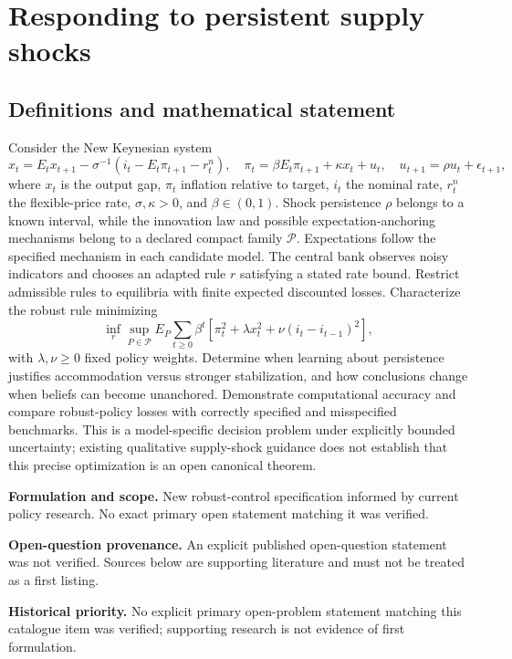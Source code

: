 \documentclass[11pt]{article}
\begin{document}
\section*{Responding to persistent supply shocks}\label{30007529}
\subsection{Definitions and mathematical statement}
Consider the New Keynesian system
\[
x_t=E_tx_{t+1}-\sigma^{-1}(i_t-E_t\pi_{t+1}-r_t^n),\quad
\pi_t=\beta E_t\pi_{t+1}+\kappa x_t+u_t,\quad
u_{t+1}=\rho u_t+\epsilon_{t+1},
\]
where \(x_t\) is the output gap, \(\pi_t\) inflation relative to target, \(i_t\) the nominal rate, \(r_t^n\) the flexible-price rate, \(\sigma,\kappa>0\), and \(\beta\in(0,1)\). Shock persistence \(\rho\) belongs to a known interval, while the innovation law and possible expectation-anchoring mechanisms belong to a declared compact family \(\mathcal P\). Expectations follow the specified mechanism in each candidate model. The central bank observes noisy indicators and chooses an adapted rule \(r\) satisfying a stated rate bound. Restrict admissible rules to equilibria with finite expected discounted losses.
Characterize the robust rule minimizing
\[
\inf_r\sup_{P\in\mathcal P}E_P\sum_{t\ge0}\beta^t
[\pi_t^2+\lambda x_t^2+\nu(i_t-i_{t-1})^2],
\]
with \(\lambda,\nu\ge0\) fixed policy weights. Determine when learning about persistence justifies accommodation versus stronger stabilization, and how conclusions change when beliefs can become unanchored. Demonstrate computational accuracy and compare robust-policy losses with correctly specified and misspecified benchmarks. This is a model-specific decision problem under explicitly bounded uncertainty; existing qualitative supply-shock guidance does not establish that this precise optimization is an open canonical theorem.

\par\textbf{Formulation and scope.} New robust-control specification informed by current policy research. No exact primary open statement matching it was verified.

\par\textbf{Open-question provenance.} An explicit published open-question statement was not verified. Sources below are supporting literature and must not be treated as a first listing.

\par\textbf{Historical priority.} No explicit primary open-problem statement matching this catalogue item was verified; supporting research is not evidence of first formulation.
\end{document}
